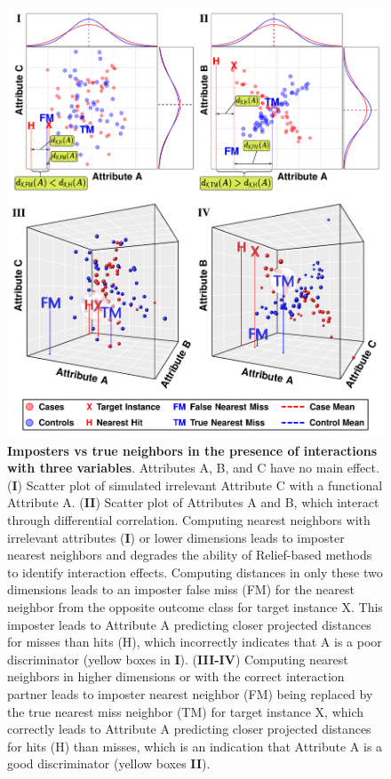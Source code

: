 \documentclass[10pt,letterpaper]{article}\usepackage[]{graphicx}\usepackage[]{color}
\begin{document}
\begin{figure}[H]
	\centering
	\includegraphics[width=\textwidth]{2by2_arrangementABC.pdf}
	\caption{{\bf Imposters vs true neighbors in the presence of interactions with three variables}. Attributes A, B, and C have no main effect. (\textbf{\selectfont I}) Scatter plot of simulated irrelevant Attribute C with a functional Attribute A. (\textbf{\selectfont II}) Scatter plot of Attributes A and B, which interact through differential correlation. Computing nearest neighbors with irrelevant attributes (\textbf{\selectfont I}) or lower dimensions leads to imposter nearest neighbors and degrades the ability of Relief-based methods to identify interaction effects. Computing distances in only these two dimensions leads to an imposter false miss (FM) for the nearest neighbor from the opposite outcome class for target instance X. This imposter leads to Attribute A predicting closer projected distances for misses than hits (H), which incorrectly indicates that A is a poor discriminator (yellow boxes in \textbf{\selectfont I}). (\textbf{\selectfont III-IV}) Computing nearest neighbors in higher dimensions or with the correct interaction partner leads to imposter nearest neighbor (FM) being replaced by the true nearest miss neighbor (TM) for target instance X, which correctly leads to Attribute A predicting closer projected distances for hits (H) than misses, which is an indication that Attribute A is a good discriminator (yellow boxes \textbf{\selectfont II}).}\label{fig:ABC}
\end{figure}
\end{document}
